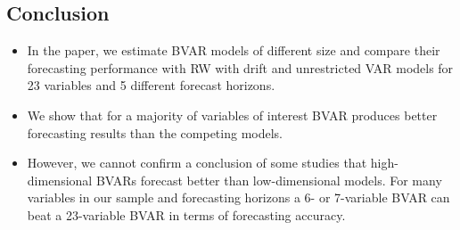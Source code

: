 \documentclass[a0, landscape]{a0poster}
\begin{document}
\begin{multicols}{3}
\subsection*{Conclusion}
\begin{itemize}
\item In the paper, we estimate BVAR models of different size and compare their forecasting performance with RW with drift and unrestricted VAR models for 23 variables and 5 different forecast horizons.
\item We show that for a majority of variables of interest BVAR produces better forecasting results than the competing models.
\item However, we cannot confirm a conclusion of some studies that high-dimensional BVARs forecast better than low-dimensional models. For many variables in our sample and forecasting horizons a 6- or 7-variable BVAR can beat a 23-variable BVAR in terms of forecasting accuracy.
\end{itemize}




\end{multicols}
\end{document}
